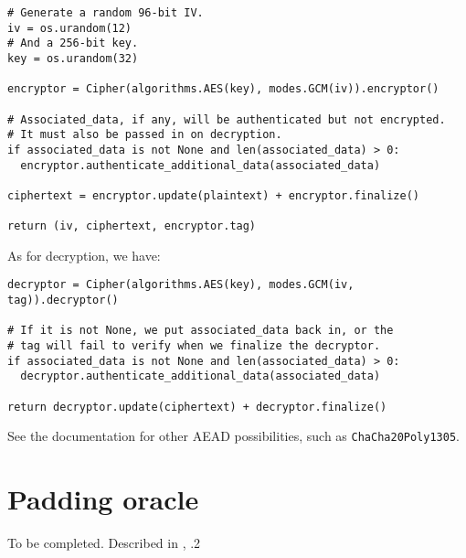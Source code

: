   \begin{verbatim}
# Generate a random 96-bit IV.
iv = os.urandom(12)
# And a 256-bit key.
key = os.urandom(32)

encryptor = Cipher(algorithms.AES(key), modes.GCM(iv)).encryptor()

# Associated_data, if any, will be authenticated but not encrypted.
# It must also be passed in on decryption.
if associated_data is not None and len(associated_data) > 0:
  encryptor.authenticate_additional_data(associated_data)

ciphertext = encryptor.update(plaintext) + encryptor.finalize()

return (iv, ciphertext, encryptor.tag)
  \end{verbatim}

  As for decryption, we have:
  \begin{verbatim}
decryptor = Cipher(algorithms.AES(key), modes.GCM(iv, tag)).decryptor()

# If it is not None, we put associated_data back in, or the
# tag will fail to verify when we finalize the decryptor.
if associated_data is not None and len(associated_data) > 0:
  decryptor.authenticate_additional_data(associated_data)

return decryptor.update(ciphertext) + decryptor.finalize()
  \end{verbatim}
  See the documentation for other AEAD possibilities, such as \texttt{ChaCha20Poly1305}.

\section{Padding oracle}
  \label{sec:padding_oracle}
  To be completed. Described in \cite{KatzLindell:IMC}, .2


